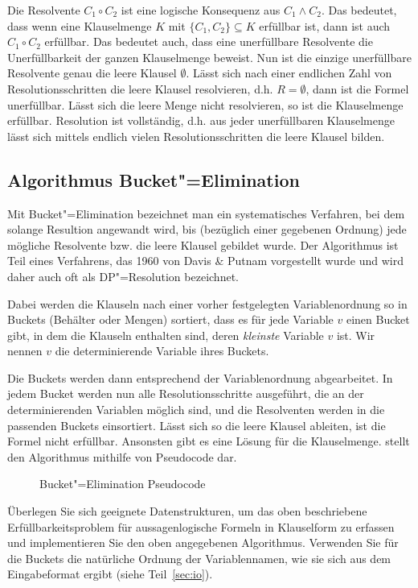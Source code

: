 \documentclass{sdqassignment}
\begin{document}
Die Resolvente $C_1 \circ C_2$ ist eine logische Konsequenz aus $C_1 \land C_2$. Das bedeutet, dass wenn eine Klauselmenge $K$ mit $\{ C_1, C_2 \} \subseteq K$ erfüllbar ist, dann ist auch $C_1 \circ C_2$ erfüllbar. Das bedeutet auch, dass eine unerfüllbare Resolvente die Unerfüllbarkeit der ganzen Klauselmenge beweist. Nun ist die einzige unerfüllbare Resolvente genau die leere Klausel $\emptyset$. Lässt sich nach einer endlichen Zahl von Resolutionsschritten die leere Klausel resolvieren, d.h. $R = \emptyset$, dann ist die Formel unerfüllbar. Lässt sich die leere Menge nicht resolvieren, so ist die Klauselmenge erfüllbar. Resolution ist vollständig, d.h. aus jeder unerfüllbaren Klauselmenge lässt sich mittels endlich vielen Resolutionsschritten die leere Klausel bilden.

\subsection{Algorithmus Bucket"=Elimination}
\label{sec:algo}

Mit Bucket"=Elimination bezeichnet man ein systematisches Verfahren, bei dem solange Resultion angewandt wird, bis (bezüglich einer gegebenen Ordnung) jede mögliche Resolvente bzw. die leere Klausel gebildet wurde. Der Algorithmus ist Teil eines Verfahrens, das 1960 von Davis \& Putnam vorgestellt wurde und wird daher auch oft als DP"=Resolution bezeichnet.

Dabei werden die Klauseln nach einer vorher festgelegten Variablenordnung so in Buckets (Behälter oder Mengen) sortiert, dass es für jede Variable $v$ einen Bucket gibt, in dem die Klauseln enthalten sind, deren \textit{kleinste} Variable $v$ ist. Wir nennen $v$ die determinierende Variable ihres Buckets.

Die Buckets werden dann entsprechend der Variablenordnung abgearbeitet. In jedem Bucket werden nun alle Resolutionsschritte ausgeführt, die an der determinierenden Variablen möglich sind, und die Resolventen werden in die passenden Buckets einsortiert. Lässt sich so die leere Klausel ableiten, ist die Formel nicht erfüllbar. Ansonsten gibt es eine Lösung für die Klauselmenge.  stellt den Algorithmus mithilfe von Pseudocode dar.

\begin{figure}[ht]
\caption{Bucket"=Elimination Pseudocode}
\label{pseudocode}
\end{figure}


Überlegen Sie sich geeignete Datenstrukturen, um das oben beschriebene Erfüllbarkeitsproblem für aussagenlogische Formeln in Klauselform zu erfassen und implementieren Sie den oben angegebenen Algorithmus. Verwenden Sie für die Buckets die natürliche Ordnung der Variablennamen, wie sie sich aus dem Eingabeformat ergibt (siehe Teil~\ref{sec:io}).
\end{document}
